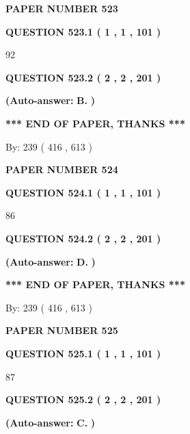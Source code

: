 \documentclass{ctexart}
\begin{document}
   
 {\textbf{ \Large{ PAPER NUMBER  523  }}}
   
   
   
   
  
  
{\textbf{\large{QUESTION
523.1 
 ( 1 , 1 , 101 )
}}}

92
  
  
{\textbf{\large{QUESTION
523.2 
 ( 2 , 2 , 201 )
}}}
 
 
{\textbf{(Auto-answer:}}
{\textbf{\large{
B.}}}
{\textbf{)}}
 
 
   
   
   
   
\vspace{1.0in} 
{\textbf{\large{ *** END OF PAPER, THANKS *** }}} 
   
   
\hspace{1.0in} By: 
 239 ( 416 ,  613 )
   
   
   
   
\newpage 
\setcounter{page}{ 
   524001 } 
   
   
 {\textbf{ \Large{ PAPER NUMBER  524  }}}
   
   
   
   
  
  
{\textbf{\large{QUESTION
524.1 
 ( 1 , 1 , 101 )
}}}

86
  
  
{\textbf{\large{QUESTION
524.2 
 ( 2 , 2 , 201 )
}}}
 
 
{\textbf{(Auto-answer:}}
{\textbf{\large{
D.}}}
{\textbf{)}}
 
 
   
   
   
   
\vspace{1.0in} 
{\textbf{\large{ *** END OF PAPER, THANKS *** }}} 
   
   
\hspace{1.0in} By: 
 239 ( 416 ,  613 )
   
   
   
   
\newpage 
\setcounter{page}{ 
   525001 } 
   
   
 {\textbf{ \Large{ PAPER NUMBER  525  }}}
   
   
   
   
  
  
{\textbf{\large{QUESTION
525.1 
 ( 1 , 1 , 101 )
}}}

87
  
  
{\textbf{\large{QUESTION
525.2 
 ( 2 , 2 , 201 )
}}}
 
 
{\textbf{(Auto-answer:}}
{\textbf{\large{
C.}}}
{\textbf{)}}
 
\end{document}
